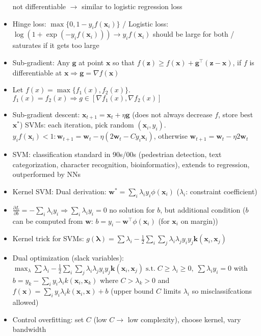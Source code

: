 \documentclass[11pt]{scrartcl}
\begin{document}
\begin{itemize}
        not differentiable \( \rightarrow \) similar to logistic regression loss
    \item Hinge loss: \( \max \{ 0, 1 - y_i f ( \bm{x}_i ) \} \) / Logistic loss: 
        \( \log ( 1 + \exp ( - y_i f ( \bm{x}_i ) ) ) \rightarrow y_i f ( \bm{x}_i ) \) 
        should be large for both / saturates if it gets too large
    \item Sub-gradient: Any \( \bm{g} \) at point \( \bm{x} \) so that 
        \( f ( \bm{z} ) \geq f ( \bm{x} ) + \bm{g}^\top ( \bm{z} - \bm{x} ) \), if \( f \) is 
        differentiable at \( \bm{x} \Rightarrow \bm{g} = \nabla f ( \bm{x} ) \) 
    \item Let \( f ( x ) = \max \{ f_1 ( x ), f_2 ( x ) \} \). \( f_1 ( x ) = 
        f_2 ( x ) \Rightarrow g \in [ \nabla f_1 ( x ), \nabla f_2 ( x ) ] \)
    \item Sub-gradient descent: \( \bm{x}_{t + 1} = \bm{x}_t + \eta \bm{g} \) (does not always 
        decrease \( f \), store best \( \bm{x}^* \)) SVMs: each iteration, pick random 
        \( ( \bm{x}_i, y_i ) \). \( y_i f ( \bm{x}_i ) < 1 : \bm{w}_{t + 1} = 
        \bm{w}_t - \eta ( 2 \bm{w}_t - C y_i \bm{x}_i ) \), otherwise \( \bm{w}_{t + 1} = 
        \bm{w}_t - \eta 2 \bm{w}_t \)
    \item SVM: classification standard in 90s/00s (pedestrian detection, text categorization, 
        character recognition, bioinformatics), extends to regression, outperformed by NNs
    \item Kernel SVM: Dual derivation: \( \bm{w}^* = \sum_i \lambda_i y_i \phi ( \bm{x}_i ) \) 
        (\( \lambda_i \): constraint coefficient)
    \item \( \frac{\partial L}{\partial b} = - \sum_i \lambda_i y_i \Rightarrow 
        \sum_i \lambda_i y_i = 0 \) no solution for \( b \), but additional condition 
        (\( b \) can be computed from \( \bm{w} \): \( b = 
        y_i - \bm{w}^\top \phi ( \bm{x}_i ) \) (for \( \bm{x}_i \) on margin))
    \item Kernel trick for SVMs: \( g ( \bm{\lambda} ) = 
        \sum \lambda_i - \frac{1}{2} \sum_i \sum_j \lambda_i \lambda_j y_i y_j 
        \bm{k} ( \bm{x}_i, \bm{x}_j ) \)
    \item Dual optimization (slack variables): \( \max_\lambda \sum \lambda_i - \frac{1}{2} 
        \sum_i \sum_j \lambda_i \lambda_j y_i y_j \bm{k} ( \bm{x}_i, \bm{x}_j ) 
        \; \mathrm{s.t.} \; C \geq \lambda_i \geq 0, \; \sum \lambda_i y_i = 0 \) with 
        \( b = y_k - \sum_i y_i \lambda_i k ( \bm{x}_i, \bm{x}_k ) \) where 
        \( C > \lambda_k > 0 \) and \( f ( \bm{x} ) = 
        \sum_i y_i \lambda_i k ( \bm{x}_i, \bm{x} ) + b \) (upper bound \( C \) limits 
        \( \lambda_i \) so misclassifcations allowed)
    \item Control overfitting: set \( C \) (low \( C \rightarrow \) low complexity), choose 
        kernel, vary bandwidth
\end{itemize}
\end{document}
